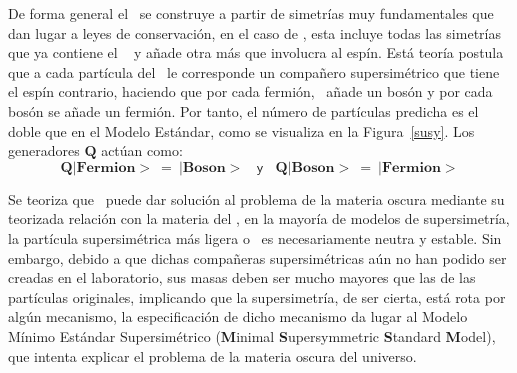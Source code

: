 De forma general el \ME ~se construye a partir de simetrías muy fundamentales que dan lugar a leyes de conservación, en el caso de \SUSY, esta incluye todas las simetrías que ya contiene el \ME~ y añade otra más que involucra al espín. Está teoría postula que a cada partícula del \ME ~le corresponde un compañero supersimétrico que tiene el espín contrario, haciendo que por cada fermión, \SUSY ~añade un bosón y por cada bosón se añade un fermión. Por tanto, el número de partículas predicha es el doble que en el Modelo Estándar, como se visualiza en la Figura~\ref{susy}. Los generadores $\mathbf{Q}$ actúan como:
\begin{equation}
\mathbf{Q}|\mathbf{Fermion}> ~ = ~ |\mathbf{Boson}> ~~~~ \textsf{y} ~~~~ \mathbf{Q}|\mathbf{Boson}> ~ = ~ |\mathbf{Fermion}>
\end{equation}

Se teoriza que \SUSY ~puede dar solución al problema de la materia oscura mediante su teorizada relación con la materia del \ME, en la mayoría de modelos de supersimetría, la partícula supersimétrica más ligera o \LSP ~es necesariamente neutra y estable. %
Sin embargo, debido a que dichas compañeras supersimétricas aún no han podido ser creadas en el laboratorio, sus masas deben ser mucho mayores que las de las partículas originales, implicando que la supersimetría, de ser cierta, está rota por algún mecanismo, la especificación de dicho mecanismo da lugar al Modelo Mínimo Estándar Supersimétrico \MSSM(\textbf{M}inimal \textbf{S}upersymmetric \textbf{S}tandard \textbf{M}odel), que intenta explicar el problema de la materia oscura del universo.





 